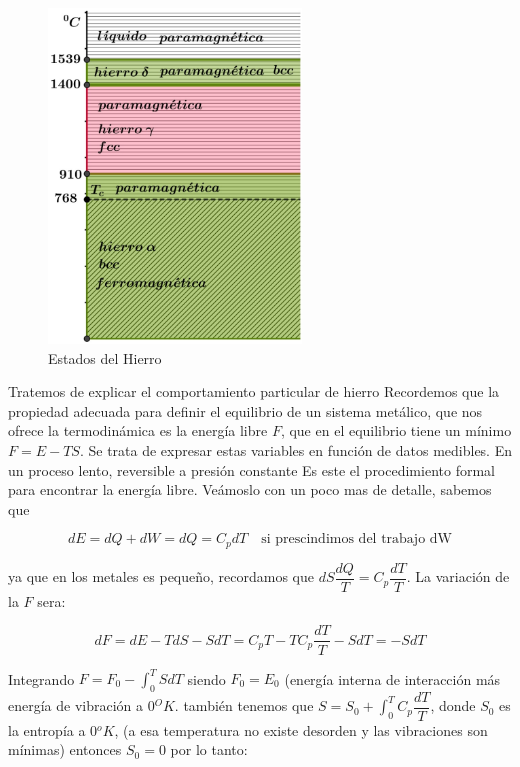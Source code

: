 \begin{figure}[H]
    \centering
    \includegraphics[width=0.6\textwidth]{./Figures/fig_d1}
	\caption{Estados del Hierro}
	\label{fig:d1}
\end{figure}

Tratemos de explicar el comportamiento particular de hierro Recordemos que la propiedad adecuada para definir el equilibrio de un sistema metálico, que nos ofrece la termodinámica es la energía libre $F$, que en el equilibrio tiene un mínimo $F=E-TS$. Se trata de expresar estas variables en función de datos medibles. En un proceso lento, reversible a presión constante Es este el procedimiento formal para encontrar la energía libre. Veámoslo con un poco mas de detalle, sabemos que

\begin{equation}
	dE=dQ+dW=dQ=C_{p}dT \quad\text{si prescindimos del trabajo dW}
\end{equation}

ya que en los metales es pequeño, recordamos que $dS\dfrac{dQ}{T}=C_{p}\dfrac{dT}{T}$. La variación de la $F$ sera:

\begin{equation}
	dF=dE-TdS-SdT=C_{p}T-TC_{p}\dfrac{dT}{T}-SdT=-SdT
\end{equation}


Integrando $F=F_{0}-\int_{0}^{T}SdT$ siendo $F_{0}=E_{0}$ (energía interna de interacción más energía de vibración a $0{^{O}K}$. también tenemos que $S=S_{0}+\int_{0}^{T}C_{p}\dfrac{dT}{T}$, donde $S_{0}$ es la entropía a $0{^{o}K}$, (a esa temperatura no existe desorden y las vibraciones son mínimas) entonces $S_{0}=0$ por lo tanto:

